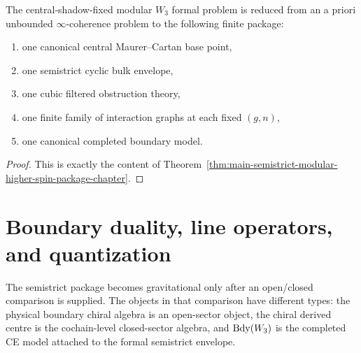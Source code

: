 \begin{corollary}
\label{cor:platonic-reduction-W3-frontier}
The central-shadow-fixed modular $W_3$ formal problem is reduced from an
a priori unbounded $\infty$-coherence problem to the following finite
package:
\begin{enumerate}[label=\textup{(\alph*)}]
 \item one canonical central Maurer--Cartan base point,
 \item one semistrict cyclic bulk envelope,
 \item one cubic filtered obstruction theory,
 \item one finite family of interaction graphs at each fixed $(g,n)$,
 \item one canonical completed boundary model.
\end{enumerate}
\end{corollary}

\begin{proof}
This is exactly the content of Theorem~\ref{thm:main-semistrict-modular-higher-spin-package-chapter}.\qedhere
\end{proof}

\section{Boundary duality, line operators, and quantization}
\label{sec:boundary-duality-line-operators}

The semistrict package becomes gravitational only after an open/closed
comparison is supplied. The objects in that comparison have different
types: the physical boundary chiral algebra is an open-sector object,
the chiral derived centre is the cochain-level closed-sector algebra, and
\(\operatorname{Bdy}(W_3)\) is the completed CE model attached to the formal
semistrict envelope.

